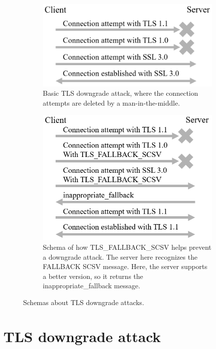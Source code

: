 \documentclass[journal=tches,final]{iacrtrans}
\begin{document}
\begin{figure}
    \begin{subfigure}{.48\textwidth}
        \centering
        \includegraphics[width=0.9\linewidth]{diagrams-i-made/TLS-dowgrade-attack.png}
        \caption{Basic TLS downgrade attack, where the connection attempts are deleted by a man-in-the-middle.}
        \label{fig:basic-TLS-downgrade-attack}
    \end{subfigure}
    \hfill
    \begin{subfigure}{.48\textwidth}
        \centering
        \includegraphics[width=0.9\linewidth]{diagrams-i-made/TLS-dowgrade-protection.png}
        \caption{Schema of how TLS\_FALLBACK\_SCSV helps prevent a downgrade attack. The server here recognizes the FALLBACK SCSV message. Here, the server supports a better version, so it returns the inappropriate\_fallback message.}
        \label{fig:basic-TLS-downgrade-protection}
    \end{subfigure}
    \caption{Schemas about TLS downgrade attacks.}
\end{figure}


\section{TLS downgrade attack}
\label{sec:TLS-downgrade-attack}
\end{document}
